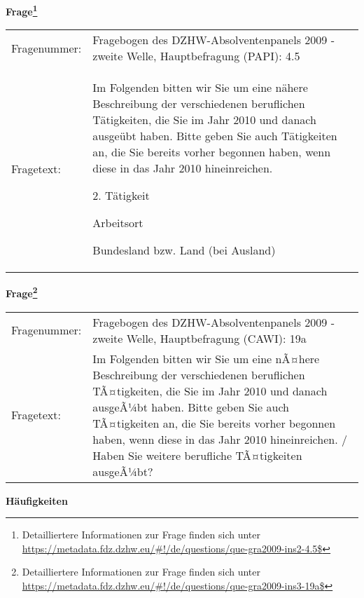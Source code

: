 				\vspace*{0.5cm}
                \noindent\textbf{Frage\footnote{Detailliertere Informationen zur Frage finden sich unter
		              \url{https://metadata.fdz.dzhw.eu/\#!/de/questions/que-gra2009-ins2-4.5$}}}\\
				\begin{tabularx}{\hsize}{@{}lX}
					Fragenummer: &
					  Fragebogen des DZHW-Absolventenpanels 2009 - zweite Welle, Hauptbefragung (PAPI):
					  4.5
 \\
					Fragetext: & Im Folgenden bitten wir Sie um eine nähere Beschreibung der verschiedenen beruflichen Tätigkeiten, die Sie im Jahr 2010 und danach ausgeübt haben. Bitte geben Sie auch Tätigkeiten an, die Sie bereits vorher begonnen haben, wenn diese in das Jahr 2010 hineinreichen.\par  2. Tätigkeit\par  Arbeitsort\par  Bundesland bzw. Land (bei Ausland) \\
				\end{tabularx}
				\vspace*{0.5cm}
                \noindent\textbf{Frage\footnote{Detailliertere Informationen zur Frage finden sich unter
		              \url{https://metadata.fdz.dzhw.eu/\#!/de/questions/que-gra2009-ins3-19a$}}}\\
				\begin{tabularx}{\hsize}{@{}lX}
					Fragenummer: &
					  Fragebogen des DZHW-Absolventenpanels 2009 - zweite Welle, Hauptbefragung (CAWI):
					  19a
 \\
					Fragetext: & Im Folgenden bitten wir Sie um eine nÃ¤here Beschreibung der verschiedenen beruflichen TÃ¤tigkeiten, die Sie im Jahr 2010 und danach ausgeÃ¼bt haben. Bitte geben Sie auch TÃ¤tigkeiten an, die Sie bereits vorher begonnen haben, wenn diese in das Jahr 2010 hineinreichen. / Haben Sie weitere berufliche TÃ¤tigkeiten ausgeÃ¼bt? \\
				\end{tabularx}





        		\vspace*{0.5cm}
                \noindent\textbf{Häufigkeiten}

